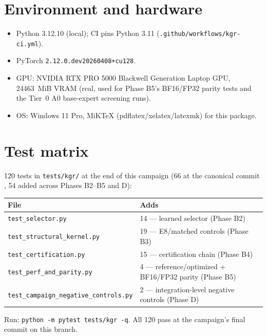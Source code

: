 \documentclass[11pt]{article}
\begin{document}

\tableofcontents

\section{Environment and hardware}
\begin{itemize}
  \item Python 3.12.10 (local); CI pins Python 3.11 (\texttt{.github/workflows/kgr-ci.yml}).
  \item PyTorch \texttt{2.12.0.dev20260408+cu128}.
  \item GPU: NVIDIA RTX PRO 5000 Blackwell Generation Laptop GPU, 24463~MiB VRAM (real, used for
        Phase B5's BF16/FP32 parity tests and the Tier~0 A0 base-expert screening runs).
  \item OS: Windows 11 Pro, MiKTeX (pdflatex/xelatex/latexmk) for this package.
\end{itemize}

\section{Test matrix}
120 tests in \texttt{tests/kgr/} at the end of this campaign (66 at the canonical commit
\texttt{\CanonicalSHA}, 54 added across Phases B2--B5 and D):
\begin{center}
\begin{tabular}{@{}p{}p{}@{}}
\toprule
File & Adds \\
\midrule
\texttt{test\_selector.py} & 14 --- learned selector (Phase B2) \\
\texttt{test\_structural\_kernel.py} & 19 --- E8/matched controls (Phase B3) \\
\texttt{test\_certification.py} & 15 --- certification chain (Phase B4) \\
\texttt{test\_perf\_and\_parity.py} & 4 --- reference/optimized + BF16/FP32 parity (Phase B5) \\
\texttt{test\_campaign\_negative\_controls.py} & 2 --- integration-level negative controls (Phase D) \\
\bottomrule
\end{tabular}
\end{center}
Run: \texttt{python -m pytest tests/kgr -q}. All 120 pass at the campaign's final commit on this
branch.
\end{document}
